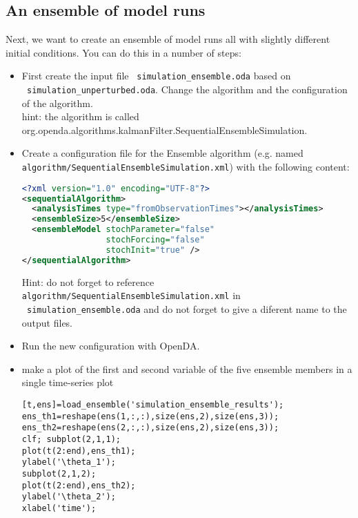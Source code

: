 \subsection{An ensemble of model runs}
Next, we want to create an ensemble of model runs all with slightly different initial conditions. 
      You can do this in a number of steps:
      \begin{itemize}
      \item First create the input file \texttt{ simulation\_ensemble.oda} based on\\
            \texttt{ simulation\_unperturbed.oda}. Change the algorithm and the
            configuration of the algorithm.\\
            hint: the algorithm is called \\
            org.openda.algorithms.kalmanFilter.SequentialEnsembleSimulation.
      \item Create a configuration file for the Ensemble algorithm (e.g. named\\
            \texttt{algorithm/SequentialEnsembleSimulation.xml}) with the following content:
\begin{lstlisting}[language=XML,frame=single,caption={XML-input for sequentialAlgorithm}]
<?xml version="1.0" encoding="UTF-8"?>
<sequentialAlgorithm>
  <analysisTimes type="fromObservationTimes"></analysisTimes>
  <ensembleSize>5</ensembleSize>
  <ensembleModel stochParameter="false"
                 stochForcing="false"
                 stochInit="true" />
</sequentialAlgorithm>

\end{lstlisting}
      Hint: do not forget to reference \texttt{ algorithm/SequentialEnsembleSimulation.xml} in \\ \texttt{ simulation\_ensemble.oda}
      and do not forget to give a diferent name to the output files.
      \item Run the new configuration with OpenDA.

      \item make a plot of the first and second variable of the five ensemble
      members in a single time-series plot
\ifshowmatlab
\begin{lstlisting}[style=MatlabStyle,frame=single,caption={Matlab}]
[t,ens]=load_ensemble('simulation_ensemble_results');
ens_th1=reshape(ens(1,:,:),size(ens,2),size(ens,3));
ens_th2=reshape(ens(2,:,:),size(ens,2),size(ens,3));
clf; subplot(2,1,1);
plot(t(2:end),ens_th1);
ylabel('\theta_1');
subplot(2,1,2);
plot(t(2:end),ens_th2);
ylabel('\theta_2');
xlabel('time');\end{lstlisting}
\fi
     

\end{itemize}

